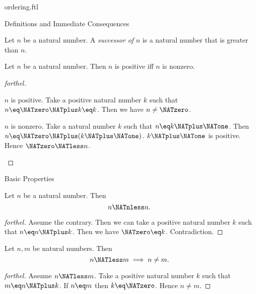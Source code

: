 \documentclass{naproche-library}
\begin{document}
\begin{smodule}[title=The Standard Ordering of the Natural Numbers]{ordering.ftl}
\begin{sfragment}{Definitions and Immediate Consequences}
  \begin{definition}[forthel,id=ARITHMETIC_04_8147686326796288]
    Let $n$ be a natural number.
    A \emph{successor of $n$} is a natural number that is greater than $n$.
  \end{definition}

  \begin{proposition}[forthel,id=ARITHMETIC_04_4826285599621120]
    Let $n$ be a natural number.
    Then $n$ is positive iff $n$ is nonzero.
  \end{proposition}
  \begin{proof}[forthel]
    \begin{case}{$n$ is positive.}
      Take a positive natural number $k$ such that $n \eq \NATzero \NATplus k \eq k$.
      Then we have $n \neq \NATzero$.
    \end{case}

    \begin{case}{$n$ is nonzero.}
      Take a natural number $k$ such that $n \eq k \NATplus \NATone$.
      Then $n \eq \NATzero \NATplus (k \NATplus \NATone)$.
      $k \NATplus \NATone$ is positive.
      Hence $\NATzero \NATless n$.
    \end{case}
  \end{proof}
\end{sfragment}

\begin{sfragment}{Basic Properties}
  \begin{proposition}[forthel,id=ARITHMETIC_04_1037693395927040]
    Let $n$ be a natural number.
    Then \[ n \NATnless n. \]
  \end{proposition}
  \begin{proof}[forthel]
    Assume the contrary.
    Then we can take a positive natural number $k$ such that $n \eq n \NATplus k$.
    Then we have $\NATzero \eq k$.
    Contradiction.
  \end{proof}

  \begin{proposition}[forthel,id=ARITHMETIC_04_8266284905005056]
    Let $n, m$ be natural numbers.
    Then \[ n \NATless m \implies n \neq m. \]
  \end{proposition}
  \begin{proof}[forthel]
    Assume $n \NATless m$.
    Take a positive natural number $k$ such that $m \eq n \NATplus k$.
    If $n \eq m$ then $k \eq \NATzero$.
    Hence $n \neq m$.
  \end{proof}


\end{sfragment}
\end{smodule}
\end{document}
